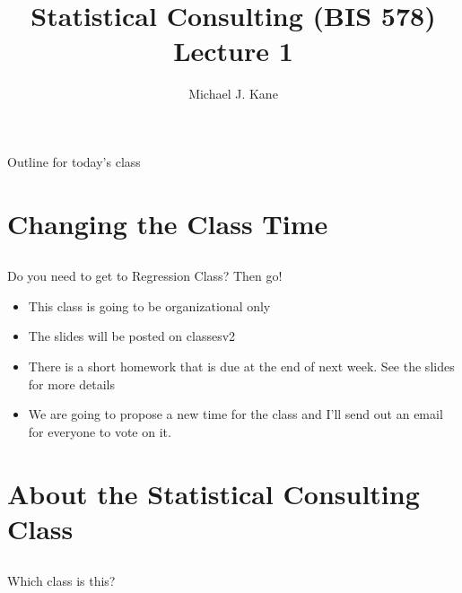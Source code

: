 \documentclass[14pt]{beamer}
\title{Statistical Consulting (BIS 578) Lecture 1}
\author{Michael J. Kane}
\date{}
\begin{document}
\begin{frame}
  \titlepage
\end{frame}

\begin{frame}{Outline for today's class}
  \tableofcontents
\end{frame}

\section{Changing the Class Time}

\subsection*{}

\begin{frame}{Do you need to get to Regression Class?  Then go!}
\begin{itemize}
\item This class is going to be organizational only
\item The slides will be posted on classesv2
\item There is a short homework that is due at the end of next
  week.  See the slides for more details
\item We are going to propose a new time for the class and
  I'll send out an email for everyone to vote on it.
\end{itemize}
\end{frame}

\begin{frame}{}
\begin{center}
\end{center}
\end{frame}

\section{About the Statistical Consulting Class}

\subsection*{}

\begin{frame}{Which class is this?}
\begin{center}
\end{center}
\end{frame}
\end{document}
